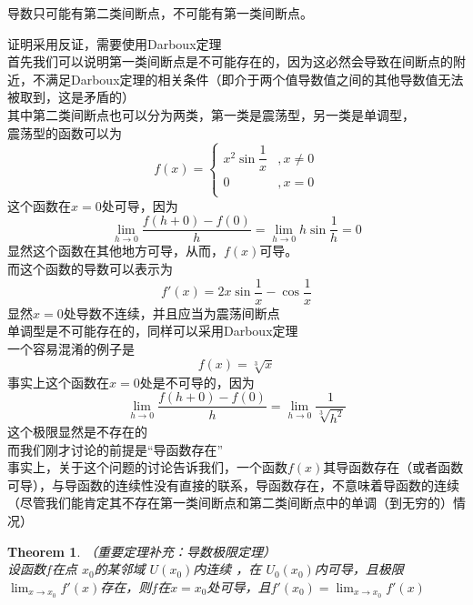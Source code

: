 \documentclass[11pt,hyperref,a4paper,UTF8]{ctexart}
\newtheorem{theorem}{Theorem}[subsection]
\begin{document}
\begin{CJK}{UTF8}{gkai}
导数只可能有第二类间断点，不可能有第一类间断点。

证明采用反证，需要使用Darboux定理\\
首先我们可以说明第一类间断点是不可能存在的，因为这必然会导致在间断点的附近，不满足Darboux定理的相关条件（即介于两个值导数值之间的其他导数值无法被取到，这是矛盾的）\\
其中第二类间断点也可以分为两类，第一类是震荡型，另一类是单调型，\\
震荡型的函数可以为
\begin{equation}
f(x) =  
\begin{cases}
x^{2}\sin \dfrac{1}{x} &,x\neq 0\\
0 &, x=0\\
\end{cases}
\end{equation}
这个函数在$x=0$处可导，因为
\[\lim_{h\to 0}\dfrac{f(h+0)-f(0)}{h}=\lim_{h\to 0}h\sin\frac{1}{h} = 0\]
显然这个函数在其他地方可导，从而，$f(x)$可导。\\

而这个函数的导数可以表示为
\[f'(x) = 2x\sin \frac{1}{x} - \cos\frac{1}{x}\]
显然$x=0$处导数不连续，并且应当为震荡间断点\\

单调型是不可能存在的，同样可以采用Darboux定理\\

一个容易混淆的例子是
\[f(x)=\sqrt[3]{x}\]
事实上这个函数在$x=0$处是不可导的，因为
\[\lim_{h\to 0 }\dfrac{f(h+0)-f(0)}{h}=\lim_{h\to 0} \dfrac{1}{\sqrt[3]{h^2}}\]
这个极限显然是不存在的\\

而我们刚才讨论的前提是“导函数存在”\\

事实上，关于这个问题的讨论告诉我们，一个函数$f(x)$其导函数存在（或者函数可导），与导函数的连续性没有直接的联系，导函数存在，不意味着导函数的连续（尽管我们能肯定其不存在第一类间断点和第二类间断点中的单调（到无穷的）情况）\\

\begin{theorem} （重要定理补充：导数极限定理）\\

设函数$f$在点 $x_0$的某邻域 $U(x_0)$内连续 ，在 $U_0(x_0)$内可导，且极限$\lim_{x\to x_0}f'(x)$存在，则$f$在$x=x_0$处可导，且$f'(x_0) = \lim_{x\to x_0}f'(x)$\\
\end{theorem}


\end{CJK}
\end{document}
